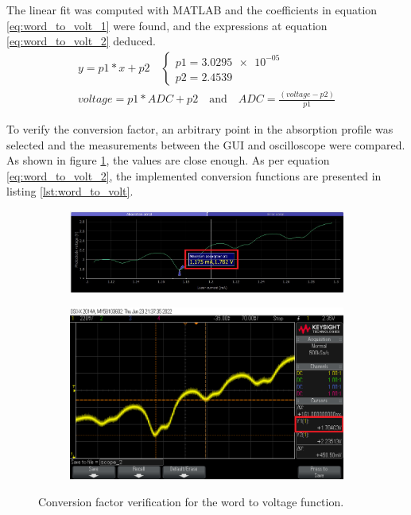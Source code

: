 \documentclass[a4paper,12pt]{article}
\begin{document}
The linear fit was computed with MATLAB and the coefficients in equation \ref{eq:word_to_volt_1} were found, and the expressions at equation \ref{eq:word_to_volt_2} deduced.
\begin{align}
y=p1*x+p2\quad
\begin{cases}
p1=\SI{3.0295e-05}{}\\ p2=2.4539
\end{cases}
\label{eq:word_to_volt_1}
\\voltage=p1*ADC+p2 \quad\text{and}\quad ADC=\frac{(voltage-p2)}{p1}
\label{eq:word_to_volt_2}
\end{align}

To verify the conversion factor, an arbitrary point in the absorption profile was selected and the measurements between the GUI and oscilloscope were compared. As shown in figure \ref{fig:word_to_volt_ver}, the values are close enough. 
As per equation \ref{eq:word_to_volt_2}, the implemented conversion functions are presented in listing \ref{lst:word_to_volt}.

\begin{figure}[!h]
\centering
\begin{subfigure}[b]{0.85\textwidth}
	\centering
	\includegraphics[width=\textwidth]{Images/word_to_volt_ver_1.png}
	\captionsetup{justification=centering}
\end{subfigure}
\newline
\begin{subfigure}[b]{0.85\textwidth}
	\centering
	\includegraphics[width=\textwidth]{Images/word_to_volt_ver_2.png}
	\captionsetup{justification=centering}
\end{subfigure}
 \caption{Conversion factor verification for the word to voltage function.}
\label{fig:word_to_volt_ver}
\end{figure}
\end{document}
